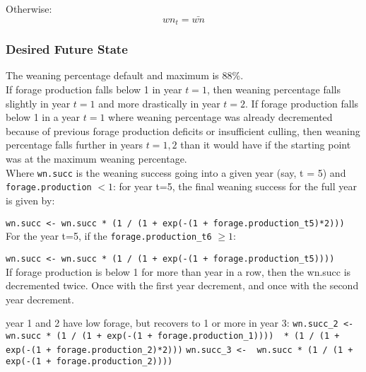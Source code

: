 \documentclass[11pt]{article}
\begin{document}
Otherwise: 
\begin{equation}
wn_t = \bar{wn}
\end{equation}

\subsubsection{Desired Future State}

The weaning percentage default and maximum is 88\%. \\

If forage production falls below 1 in year $t=1$, then weaning percentage falls slightly in year $t=1$ and more drastically in year $t=2$. If forage production falls below 1 in a year $t=1$ where weaning percentage was already decremented because of previous forage production deficits or insufficient culling, then weaning percentage falls further in years $t=1,2$ than it would have if the starting point was at the maximum weaning percentage. \\

Where \verb!wn.succ! is the weaning success going into a given year (say, t = 5) and \verb!forage.production! $< 1$:
for year t=5, the final weaning success for the full year is given by: 

\verb!wn.succ <- wn.succ * (1 / (1 + exp(-(1 + forage.production_t5)*2)))! \\

For the year t=5, if the \verb!forage.production_t6! $\ge 1$:

\verb!wn.succ <- wn.succ * (1 / (1 + exp(-(1 + forage.production_t5))))! \\

If forage production is below 1 for more than year in a row, then the wn.succ is decremented twice. Once with the first year decrement, and once with the second year decrement.

year 1 and 2 have low forage, but recovers to 1 or more in year 3:
\verb!wn.succ_2 <-  wn.succ * (1 / (1 + exp(-(1 + forage.production_1))))  * (1 / (1 + exp(-(1 + forage.production_2)*2)))! 
\verb!wn.succ_3 <-  wn.succ * (1 / (1 + exp(-(1 + forage.production_2))))! \\






 
\end{document}
